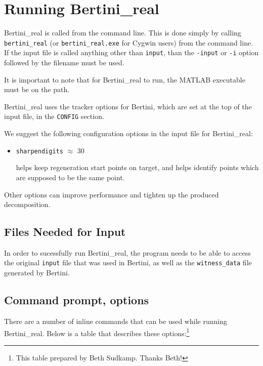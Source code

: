 
\section{Running Bertini\_real}
\label{sec:running_br}

Bertini\_real is called from the command line.   This is done simply by calling \texttt{bertini\_real} (or \texttt{bertini\_real.exe} for Cygwin users) from the command line. If the input file is called anything other than \texttt{input}, than the \texttt{-input} or \texttt{-i} option followed by the filename must be used. 

It is important to note that for Bertini\_real to run, the MATLAB executable must be on the path.


Bertini\_real uses the tracker options for Bertini, which are set at the top of the input file, in the {\tt CONFIG} section.

We suggest the following configuration options in the input file for Bertini\_real: 
\begin{itemize}
\item {\tt sharpendigits} $\approx$ 30

helps keep regeneration start points on target, and helps identify points which are supposed to be the same point.
\end{itemize}


Other options can improve performance and tighten up the produced decomposition. 


\subsection{Files Needed for Input}
In order to sucessfully run Bertini\_real, the program needs to be able to access the original \texttt{input} file that was used in Bertini, as well as the \texttt{witness\_data} file generated by Bertini.


\subsection{Command prompt, options}
There are a number of inline commands that can be used while running Bertini\_real. Below is a table that describes these options:\footnote{This table prepared by Beth Sudkamp.  Thanks Beth!}

